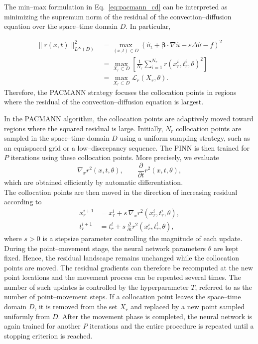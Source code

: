 \documentclass[10pt,reqno]{article}
\numberwithin{equation}{section}
\begin{document}
The min--max formulation in Eq.~\eqref{eq:pacmann_cd} can be interpreted as minimizing the supremum norm of the residual of the convection--diffusion equation over the space--time domain $D$. In particular,

\begin{align}
\| r(x,t) \|_{L^\infty(D)}^2
&=
\max_{(x,t)\in D}
\left(
\hat{u}_t
+
\boldsymbol{\beta}\cdot\nabla \hat{u}
-
\varepsilon \Delta \hat{u}
-
f
\right)^2
\\
&=
\max_{X_r\subset D}
\left[
\frac{1}{N_r}
\sum_{i=1}^{N_r}
r(x_r^i,t_r^i,\theta)^2
\right]
\\
&=
\max_{X_r\subset D}
\mathcal{L}_r(X_r,\theta).
\end{align}
Therefore, the PACMANN strategy focuses the collocation points in regions where the residual of the convection--diffusion equation is largest.


In the PACMANN algorithm, the collocation points are adaptively moved
toward regions where the squared residual is large. Initially,
$N_r$ collocation points are sampled in the space–time domain $D$
using a uniform sampling strategy, such as an equispaced grid or a
low–discrepancy sequence. The PINN is then trained for $P$ iterations
using these collocation points. More precisely, we evaluate
\[
\nabla_x r^2(x,t,\theta),
\qquad
\frac{\partial}{\partial t}r^2(x,t,\theta),
\]
which are obtained efficiently by automatic differentiation.\\
The collocation points are then moved in the direction of increasing
residual according to
\begin{equation}
\begin{aligned}
x_r^{i+1} &= x_r^i + s\,\nabla_x r^2(x_r^i,t_r^i,\theta), \\
t_r^{i+1} &= t_r^i + s\,\frac{\partial}{\partial t}r^2(x_r^i,t_r^i,\theta),
\end{aligned}
\label{pacmann_move}
\end{equation}
where $s>0$ is a stepsize parameter controlling the magnitude of each
update.\\
During the point–movement stage, the neural network parameters $\theta$
are kept fixed. Hence, the residual landscape remains unchanged while
the collocation points are moved. The residual gradients can therefore
be recomputed at the new point locations and the movement process can
be repeated several times. The number of such updates is controlled by
the hyperparameter $T$, referred to as the number of point–movement
steps. If a collocation point leaves the space–time domain $D$, it is removed
from the set $X_r$ and replaced by a new point sampled uniformly from
$D$. After the movement phase is completed, the neural network is again
trained for another $P$ iterations and the entire procedure is repeated
until a stopping criterion is reached.
\end{document}
